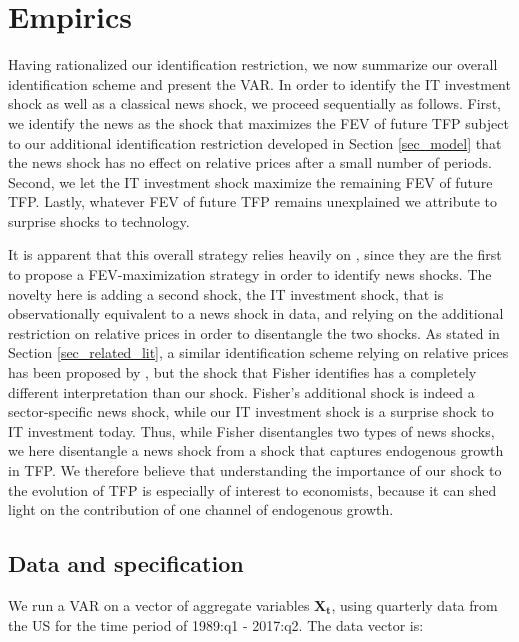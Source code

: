 \documentclass[11pt]{article}
\renewcommand{\[}{\begin{equation}}
\renewcommand{\]}{\end{equation}}
\begin{document}
\label{sec_model}

\section{Empirics}
\label{sec_empirics}
Having rationalized our identification restriction, we now summarize our overall identification scheme and present the VAR. In order to identify the IT investment shock as well as a classical news shock, we proceed sequentially as follows. First, we identify the news as the shock that maximizes the FEV of future TFP subject to our additional identification restriction developed in Section \ref{sec_model} that the news shock has no effect on relative prices after a small number of periods. Second, we let the IT investment shock maximize the remaining FEV of future TFP. Lastly, whatever FEV of future TFP remains unexplained we attribute to surprise shocks to technology. 

It is apparent that this overall strategy relies heavily on \cite{barsky_sims2011}, since they are the first to propose a FEV-maximization strategy in order to identify news shocks. The novelty here is adding a second shock, the IT investment shock, that is observationally equivalent to a news shock in data, and relying on the additional restriction on relative prices in order to disentangle the two shocks. As stated in Section \ref{sec_related_lit}, a similar identification scheme relying on relative prices has been proposed by \cite{fisher2006}, but the shock that Fisher identifies has a completely different interpretation than our shock. Fisher's additional shock is indeed a sector-specific news shock, while our IT investment shock is a surprise shock to IT investment today. Thus, while Fisher disentangles two types of news shocks, we here disentangle a news shock from a shock that captures endogenous growth in TFP. We therefore believe that understanding the importance of our shock to the evolution of TFP is especially of interest to economists, because it can shed light on the contribution of one channel of endogenous growth. 

\subsection{Data and specification}
We run a VAR on a vector of aggregate variables $\mathbf{X_t}$, using quarterly data from the US for the time period of 1989:q1 - 2017:q2. The data vector is:
\end{document}
